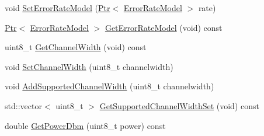 \begin{DoxyCompactItemize}
\item 
void \hyperlink{classns3_1_1WifiPhy_ac363f667899a813bb1331225bc1c1474}{Set\+Error\+Rate\+Model} (\hyperlink{classns3_1_1Ptr}{Ptr}$<$ \hyperlink{classns3_1_1ErrorRateModel}{Error\+Rate\+Model} $>$ rate)
\item 
\hyperlink{classns3_1_1Ptr}{Ptr}$<$ \hyperlink{classns3_1_1ErrorRateModel}{Error\+Rate\+Model} $>$ \hyperlink{classns3_1_1WifiPhy_a9fe36934223b75a0c3d1fd14d539af4a}{Get\+Error\+Rate\+Model} (void) const 
\item 
uint8\+\_\+t \hyperlink{classns3_1_1WifiPhy_a4a5d5009b3b3308f2baeed42a2007189}{Get\+Channel\+Width} (void) const 
\item 
void \hyperlink{classns3_1_1WifiPhy_ad4be164ac9858e525cf6c6194c39e015}{Set\+Channel\+Width} (uint8\+\_\+t channelwidth)
\item 
void \hyperlink{classns3_1_1WifiPhy_a41978029c11fa6210fbc461d55d330d0}{Add\+Supported\+Channel\+Width} (uint8\+\_\+t channelwidth)
\item 
std\+::vector$<$ uint8\+\_\+t $>$ \hyperlink{classns3_1_1WifiPhy_a1abcc260e034c4bd726b3aba9f86ad29}{Get\+Supported\+Channel\+Width\+Set} (void) const 
\item 
double \hyperlink{classns3_1_1WifiPhy_a91fbc9ea51bb2ac6114cad1f70e25af0}{Get\+Power\+Dbm} (uint8\+\_\+t power) const 
\end{DoxyCompactItemize}
